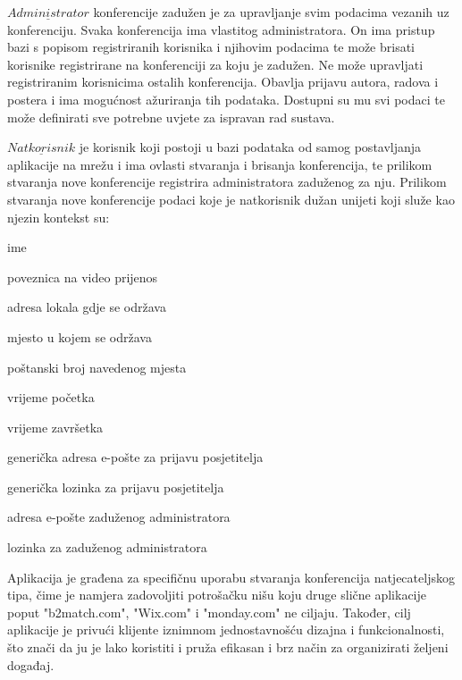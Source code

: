 		$\underline{Administrator}$ konferencije zadužen je za upravljanje svim podacima vezanih uz konferenciju. Svaka konferencija ima vlastitog administratora. On ima pristup bazi s popisom registriranih korisnika i njihovim podacima te može brisati korisnike registrirane na konferenciji za koju je zadužen. Ne može upravljati registriranim korisnicima ostalih konferencija. Obavlja prijavu autora, radova i postera i ima mogućnost ažuriranja tih podataka. Dostupni su mu svi podaci te može definirati sve potrebne uvjete za ispravan rad sustava.
		
		$\underline{Natkorisnik}$ je korisnik koji postoji u bazi podataka od samog postavljanja aplikacije na mrežu i ima ovlasti stvaranja i brisanja konferencija, te prilikom stvaranja nove konferencije registrira administratora zaduženog za nju. Prilikom stvaranja nove konferencije podaci koje je natkorisnik dužan unijeti koji služe kao njezin kontekst su:
		\begin{packed_item}
			\item ime
			\item poveznica na video prijenos
			\item adresa lokala gdje se održava
			\item mjesto u kojem se održava
			\item poštanski broj navedenog mjesta
			\item vrijeme početka
			\item vrijeme završetka
			\item generička adresa e-pošte za prijavu posjetitelja
			\item generička lozinka za prijavu posjetitelja
			\item adresa e-pošte zaduženog administratora
			\item lozinka za zaduženog administratora
		\end{packed_item}
		
		Aplikacija je građena za specifičnu uporabu stvaranja konferencija natjecateljskog tipa, čime je namjera zadovoljiti potrošačku nišu koju druge slične aplikacije poput "b2match.com", "Wix.com" i "monday.com" ne ciljaju. Također, cilj aplikacije je privući klijente iznimnom jednostavnošću dizajna i funkcionalnosti, što znači da ju je lako koristiti i pruža efikasan i brz način za organizirati željeni događaj.

		\newpage
		
